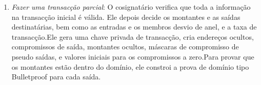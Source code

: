 \begin{enumerate}
\begin{enumerate}
        \item {\em Fazer uma transacção parcial}: O cosignatário verifica que toda a informação na transacção inicial é válida. Ele depois decide os montantes e as saídas destinatárias, bem como as entradas e os membros desvio de anel, e a taxa de transacção.\newline Ele gera uma chave privada de transacção, cria endereços ocultos, compromissos de saída, montantes ocultos, máscaras de compromisso de pseudo saídas, e valores iniciais para os compromissos a zero.\newline Para provar que os montantes estão dentro do domínio, ele constroi a prova de domínio tipo Bulletproof para cada saída. 


\end{enumerate}
\end{enumerate}
